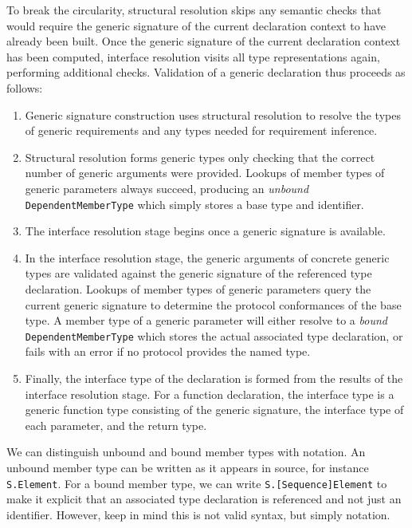 \documentclass[a4paper,headsepline,bibliography=totoc,toc=flat,fleqn,twoside=semi]{scrbook}
\theoremstyle{definition}
\theoremstyle{definition}
\theoremstyle{definition}
\begin{document}
To break the circularity, structural resolution skips any semantic checks that would require the generic signature of the current declaration context to have already been built. Once the generic signature of the current declaration context has been computed, interface resolution visits all type representations again, performing additional checks. Validation of a generic declaration thus proceeds as follows:
\begin{enumerate}
\item Generic signature construction uses structural resolution to resolve the types of generic requirements and any types needed for requirement inference.
\item Structural resolution forms generic types only checking that the correct number of generic arguments were provided. Lookups of member types of generic parameters always succeed, producing an \emph{unbound} \texttt{DependentMemberType} which simply stores a base type and identifier.
\item The interface resolution stage begins once a generic signature is available.
\item In the interface resolution stage, the generic arguments of concrete generic types are validated against the generic signature of the referenced type declaration. Lookups of member types of generic parameters query the current generic signature to determine the protocol conformances of the base type. A member type of a generic parameter will either resolve to a \emph{bound} \texttt{DependentMemberType} which stores the actual associated type declaration, or fails with an error if no protocol provides the named type.
\item Finally, the interface type of the declaration is formed from the results of the interface resolution stage. For a function declaration, the interface type is a generic function type consisting of the generic signature, the interface type of each parameter, and the return type.
\end{enumerate}
We can distinguish unbound and bound member types with notation. An unbound member type can be written as it appears in source, for instance \texttt{S.Element}. For a bound member type, we can write \texttt{S.[Sequence]Element} to make it explicit that an associated type declaration is referenced and not just an identifier. However, keep in mind this is not valid syntax, but simply notation.
\end{document}
